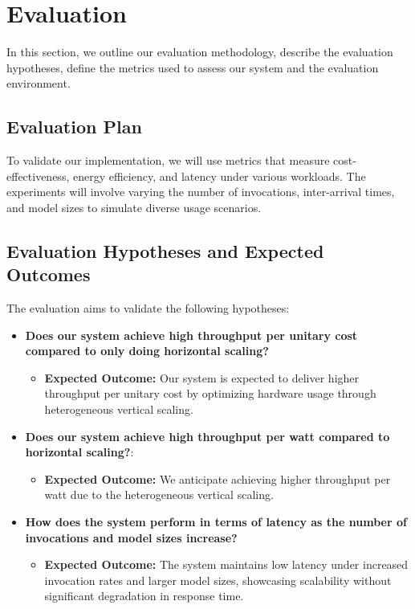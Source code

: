 
\section{Evaluation}

In this section, we outline our evaluation methodology, describe the evaluation hypotheses, define the metrics used to assess our system and the evaluation environment. 

\subsection{Evaluation Plan}

To validate our implementation, we will use metrics that measure cost-effectiveness, energy efficiency, and latency under various workloads. The experiments will involve varying the number of invocations, inter-arrival times, and model sizes to simulate diverse usage scenarios. 

\subsection{Evaluation Hypotheses and Expected Outcomes}

The evaluation aims to validate the following hypotheses:
\begin{itemize}
    \item \textbf{Does our system achieve high throughput per unitary cost compared to only doing horizontal scaling?}
        \begin{itemize}
        \item \textbf{Expected Outcome:} Our system is expected to deliver higher throughput per unitary cost by optimizing hardware usage through heterogeneous vertical scaling.
    \end{itemize}
    \item \textbf{Does our system achieve high throughput per watt compared to horizontal scaling?}: 
        \begin{itemize}
        \item \textbf{Expected Outcome:} We anticipate achieving higher throughput per watt due to the heterogeneous vertical scaling.
    \end{itemize}
    \item \textbf{How does the system perform in terms of latency as the number of invocations and model sizes increase?}
    \begin{itemize}
        \item \textbf{Expected Outcome:} The system maintains low latency under increased invocation rates and larger model sizes, showcasing scalability without significant degradation in response time.
    \end{itemize}

\end{itemize}

